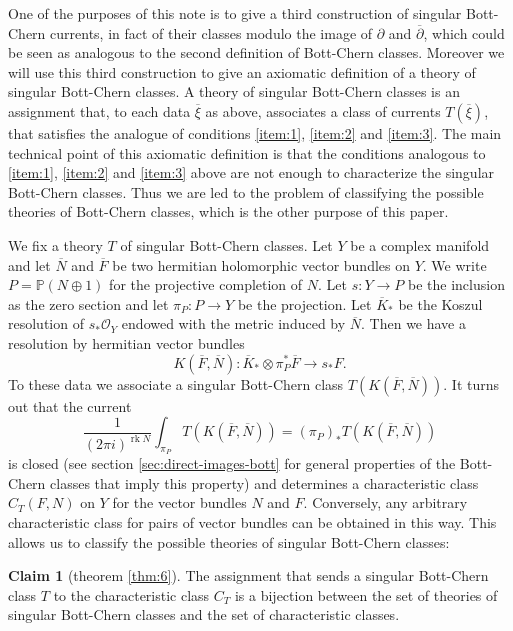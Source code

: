 \documentclass[10pt,twoside]{article}
\numberwithin{equation}{section}
\theoremstyle{plain}
\theoremstyle{definition}
\newtheorem{claim}{Claim}
\DeclareMathOperator{\rk}{rk}
\begin{document}
One of the purposes of this note is to give a third construction of singular
Bott-Chern currents, in fact of their classes modulo the image of
$\partial$ and $\overline \partial$, which could be seen as analogous
to the second 
definition of Bott-Chern classes. Moreover we will use this third
construction to give an axiomatic definition of a theory of singular
Bott-Chern classes. A theory of singular Bott-Chern classes 
is an assignment that, to each  data $\overline{\xi}$
as above, associates a class of currents $T(\overline{\xi})$, that
satisfies the analogue of conditions \ref{item:1}, \ref{item:2} and
\ref{item:3}.
The main technical point of this axiomatic
definition is that the conditions analogous to \ref{item:1},
\ref{item:2} and \ref{item:3} above are not enough to characterize
the singular Bott-Chern classes. Thus we are led to the problem of
classifying the possible theories of Bott-Chern classes, which is the
other purpose of this paper.

We fix a theory $T$ of singular Bott-Chern
classes. 
Let $Y$ be a complex manifold and let $\overline N$ and $\overline
F$ be two hermitian holomorphic vector bundles on $Y$. We write
$P=\mathbb{P}(N\oplus 1)$ for the projective completion of $N$. Let
$s\colon Y\longrightarrow P$ be the inclusion as the zero section and let
$\pi_P\colon P\longrightarrow Y$ be the projection. Let
$\overline{K}_{\ast}$ be the Koszul resolution of
$s_{\ast}\mathcal{O}_Y$ endowed with the metric induced by
$\overline{N}$. Then we have a resolution by hermitian vector
bundles
\begin{displaymath}
 K(\overline F,\overline N)\colon \overline{K}_{\ast}\otimes
 \pi_P^{\ast}\overline{F}\longrightarrow s_{\ast}F. 
\end{displaymath}
To these data we associate a singular Bott-Chern class $T(K(\overline
F,\overline N))$. It turns out that the current
\begin{displaymath}
\frac{1}{(2\pi i)^{\rk N}}  
\int_{\pi_P}  T(K(\overline F,\overline
  N))=(\pi_P)_{\ast}T(K(\overline F,\overline N)) 
\end{displaymath}
is closed (see section \ref{sec:direct-images-bott} for general
properties of the Bott-Chern classes that imply this property) and
determines a characteristic class $C_T(F,N)$ on $Y$ for the vector
bundles $N$ and $F$. Conversely, any arbitrary characteristic class
for pairs of vector bundles can be obtained in this way. This allows
us to classify the possible
theories of singular Bott-Chern classes:

\begin{claim} [theorem \ref{thm:6}] The assignment that sends a
singular Bott-Chern class $T$ to the characteristic class $C_{T}$ is a
bijection between the set of theories of singular Bott-Chern classes and the set
of characteristic classes.   
\end{claim}
\end{document}
